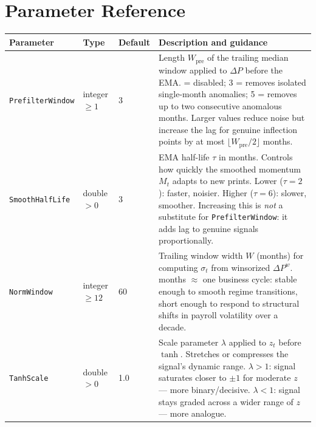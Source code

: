 \documentclass[11pt, a4paper]{article}
\newcommand{\dP}{\Delta P}
\begin{document}
\section{Parameter Reference}
\label{sec:params}

\begin{table}[H]
\centering
\renewcommand{\arraystretch}{1.5}
\begin{tabular}{p{3.8cm} p{1.4cm} p{1.4cm} p{7.4cm}}
\toprule
\textbf{Parameter} & \textbf{Type} & \textbf{Default} & \textbf{Description and guidance} \\
\midrule
\texttt{PrefilterWindow} &
  integer $\geq 1$ &
  3 &
  Length $W_{\mathrm{pre}}$ of the trailing median window applied to $\dP$ before the EMA. \newline
  1 = disabled; 3 = removes isolated single-month anomalies; 5 = removes up to two consecutive anomalous months. Larger values reduce noise but increase the lag for genuine inflection points by at most $\lfloor W_{\mathrm{pre}}/2 \rfloor$ months. \\

\texttt{SmoothHalfLife} &
  double $> 0$ &
  3 &
  EMA half-life $\tau$ in months. Controls how quickly the smoothed momentum $M_t$ adapts to new prints.\newline
  Lower ($\tau=2$): faster, noisier. Higher ($\tau=6$): slower, smoother. Increasing this is \emph{not} a substitute for \texttt{PrefilterWindow}: it adds lag to genuine signals proportionally. \\

\texttt{NormWindow} &
  integer $\geq 12$ &
  60 &
  Trailing window width $W$ (months) for computing $\sigma_t$ from winsorized $\dP^w$.\newline
  60 months $\approx$ one business cycle: stable enough to smooth regime transitions, short enough to respond to structural shifts in payroll volatility over a decade. \\

\texttt{TanhScale} &
  double $> 0$ &
  1.0 &
  Scale parameter $\lambda$ applied to $z_t$ before $\tanh$. Stretches or compresses the signal's dynamic range.\newline
  $\lambda > 1$: signal saturates closer to $\pm 1$ for moderate $z$ — more binary/decisive.\newline
  $\lambda < 1$: signal stays graded across a wider range of $z$ — more analogue. \\


\end{tabular}
\end{table}
\end{document}
